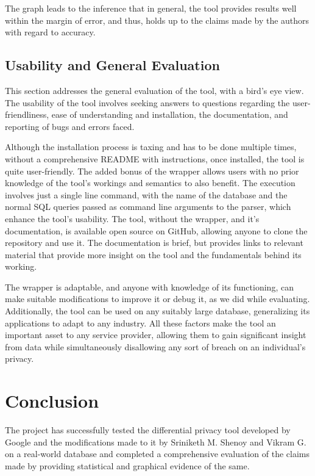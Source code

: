 \documentclass[acmsmall]{acmart}
\begin{document}
The graph leads to the inference that in general, the tool provides results well within the margin of error, and thus, holds up to the claims made by the authors with regard to accuracy.

\subsection{Usability and General Evaluation}\label{4.5}
This section addresses the general evaluation of the tool, with a bird’s eye view. The usability of the tool involves seeking answers to questions regarding the user-friendliness, ease of understanding and installation, the documentation, and reporting of bugs and errors faced.

Although the installation process is taxing and has to be done multiple times, without a comprehensive README with instructions, once installed, the tool is quite user-friendly. The added bonus of the wrapper allows users with no prior knowledge of the tool’s workings and semantics to also benefit. The execution involves just a single line command, with the name of the database and the normal SQL queries passed as command line arguments to the parser, which enhance the tool’s usability. The tool, without the wrapper, and it’s documentation, is available open source on GitHub, allowing anyone to clone the repository and use it. The documentation is brief, but provides links to relevant material that provide more insight on the tool and the fundamentals behind its working.

The wrapper is adaptable, and anyone with knowledge of its functioning, can make suitable modifications to improve it or debug it, as we did while evaluating. Additionally, the tool can be used on any suitably large database, generalizing its applications to adapt to any industry. All these factors make the tool an important asset to any service provider, allowing them to gain significant insight from data while simultaneously disallowing any sort of breach on an individual’s privacy.

\section{Conclusion}\label{5}
The project has successfully tested the differential privacy tool developed by Google and the modifications made to it by Sriniketh M. Shenoy and Vikram G. on a real-world database and completed a comprehensive evaluation of the claims made by providing statistical and graphical evidence of the same.
\end{document}
